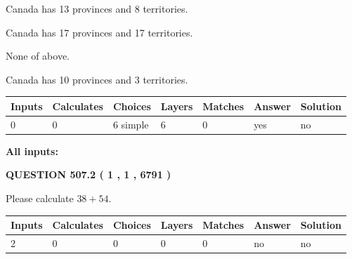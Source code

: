 \documentclass[12pt]{article}
\begin{document}
 
Canada has  13 provinces and  8 territories.
 
 
Canada has  17 provinces and  17 territories.
 
 
 None of above.
 
 
\noindent{}
 
 
Canada has 10  provinces and 3 territories.
 
 
\noindent{}
 
 
   
   
   
   
\noindent\begin{tabular}{|l|l|l|l|l|l|l|}
 \hline
Inputs & Calculates & Choices & Layers & Matches & Answer & Solution \\ \hline
 0  & 
 0  & 
 6
  simple  
  & 
 6  & 
 0  & 
  yes & 
  no 
  \\ \hline
 \end{tabular}
   
   
   
   
\noindent{}
   
   
   
   
\noindent\vspace{0.1in}\hspace{-0.08in} {\textbf{\Large{All inputs: }}}
   
   
  
\vspace{0.2in}
  
{\textbf{\Large{QUESTION
507.2 
 ( 1 , 1 , 6791 )
}}}
  
  
 
Please calculate $ %
38 +  %
54 $.
 
 
   
   
   
   
\noindent\begin{tabular}{|l|l|l|l|l|l|l|}
 \hline
Inputs & Calculates & Choices & Layers & Matches & Answer & Solution \\ \hline
 2  & 
 0  & 
 0
  & 
 0  & 
 0  & 
  no & 
  no 
  \\ \hline
 \end{tabular}
   
\end{document}
